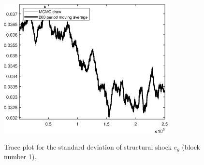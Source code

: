 \begin{figure}[H]
\centering
  \includegraphics[width=0.8\textwidth]{BRS_imp_mobility/graphs/TracePlot_SE_e_g_blck_1}\\
    \caption{Trace plot for the standard deviation of structural shock ${e_g}$ (block number 1).}
\end{figure}
